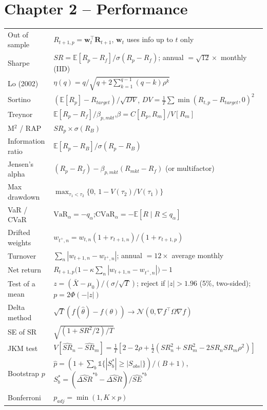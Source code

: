 \documentclass[11pt,a4paper]{report}
\newcommand{\E}{\mathbb{E}}
\newcommand{\w}{\bm{w}}
\newcommand{\R}{\bm{R}}
\newcommand{\T}{^{\top}}
\begin{document}
{\section*{Chapter 2 -- Performance}
\begin{tabularx}{\textwidth}{@{}lX@{}}
\toprule
Out of sample & $R_{t+1,p}=\w_t\T\R_{t+1}$, $\w_t$ uses info up to $t$ only \\
Sharpe & $SR=\E[R_p-R_f]/\sigma(R_p-R_f)$; annual $=\sqrt{12}\times$ monthly (IID) \\
Lo (2002) & $\eta(q)=q/\sqrt{q+2\sum_{k=1}^{q-1}(q-k)\rho^k}$ \\
Sortino & $(\E[R_p]-R_{target})/\sqrt{DV}$, $DV=\frac1T\sum\min(R_{t,p}-R_{target},0)^2$ \\
Treynor & $\E[R_p-R_f]/\beta_{p,mkt}$,\quad $\beta=C[R_p,R_m]/V[R_m]$ \\
M$^2$ / RAP & $SR_p\times\sigma(R_B)$ \\
Information ratio & $\E[R_p-R_B]/\sigma(R_p-R_B)$ \\
Jensen's alpha & $(R_p-R_f)-\beta_{p,mkt}(R_{mkt}-R_f)$ (or multifactor) \\
Max drawdown & $\max_{\tau_1<\tau_2}\{0,\,1-V(\tau_2)/V(\tau_1)\}$ \\
VaR / CVaR & $\text{VaR}_\alpha=-q_\alpha$;\quad $\text{CVaR}_\alpha=-\E[R\mid R\le q_\alpha]$ \\
Drifted weights & $w_{t^+,n}=w_{t,n}(1+r_{t+1,n})/(1+r_{t+1,p})$ \\
Turnover & $\sum_n|w_{t+1,n}-w_{t^+,n}|$; annual $=12\times$ average monthly \\
Net return & $R_{t+1,p}\big(1-\kappa\sum_n|w_{t+1,n}-w_{t^+,n}|\big)-1$ \\
Test of a mean & $z=(\bar X-\mu_0)/(\sigma/\sqrt T)$; reject if $|z|>1.96$ (5\%, two-sided); $p=2\Phi(-|z|)$ \\
Delta method & $\sqrt T(f(\hat\theta)-f(\theta))\to\mathcal N(0,\nabla f\T\Omega\nabla f)$ \\
SE of SR & $\sqrt{(1+SR^2/2)/T}$ \\
JKM test & $V[\widehat{SR}_n-\widehat{SR}_m]=\frac1T[2-2\rho+\frac12(SR_n^2+SR_m^2-2SR_nSR_m\rho^2)]$ \\
Bootstrap $p$ & $\hat p=(1+\sum_b\mathbb 1\{|S_b^*|\ge|S_{obs}|\})/(B+1)$, $S_b^*=(\widehat{\Delta SR}^{*b}-\widehat{\Delta SR})/\widehat{SE}^{*b}$ \\
Bonferroni & $p_{adj}=\min(1,K\times p)$ \\
\bottomrule
\end{tabularx}

}
\end{document}
